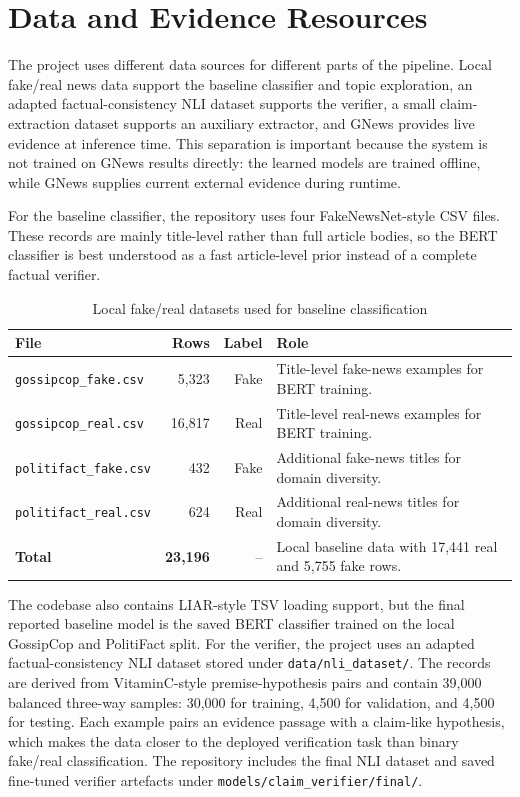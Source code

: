 \documentclass[11pt]{article}
\newcommand{\code}[1]{\texttt{#1}}
\begin{document}
\section{Data and Evidence Resources}

The project uses different data sources for different parts of the pipeline.
Local fake/real news data support the baseline classifier and topic exploration,
an adapted factual-consistency NLI dataset supports the verifier, a small
claim-extraction dataset supports an auxiliary extractor, and GNews provides
live evidence at inference time. This separation is important because the
system is not trained on GNews results directly: the learned models are trained
offline, while GNews supplies current external evidence during runtime.

For the baseline classifier, the repository uses four FakeNewsNet-style CSV
files. These records are mainly title-level rather than full article bodies, so
the BERT classifier is best understood as a fast article-level prior instead of
a complete factual verifier.

\begin{table}[H]
    \centering
    \caption{Local fake/real datasets used for baseline classification}
    \label{tab:baseline-data}
    \begin{tabularx}{\textwidth}{@{}lrrY@{}}
        \toprule
        \textbf{File} & \textbf{Rows} & \textbf{Label} & \textbf{Role} \\
        \midrule
        \code{gossipcop\_fake.csv} & 5,323 & Fake & Title-level fake-news examples for BERT training. \\
        \code{gossipcop\_real.csv} & 16,817 & Real & Title-level real-news examples for BERT training. \\
        \code{politifact\_fake.csv} & 432 & Fake & Additional fake-news titles for domain diversity. \\
        \code{politifact\_real.csv} & 624 & Real & Additional real-news titles for domain diversity. \\
        \midrule
        \textbf{Total} & \textbf{23,196} & -- & Local baseline data with 17,441 real and 5,755 fake rows. \\
        \bottomrule
    \end{tabularx}
\end{table}

The codebase also contains LIAR-style TSV loading support, but the final
reported baseline model is the saved BERT classifier trained on the local
GossipCop and PolitiFact split. For the verifier, the project uses an adapted
factual-consistency NLI dataset stored under \code{data/nli\_dataset/}. The
records are derived from VitaminC-style premise-hypothesis pairs and contain
39,000 balanced three-way
samples: 30,000 for training, 4,500 for validation, and 4,500 for testing. Each
example pairs an evidence passage with a claim-like hypothesis, which makes the
data closer to the deployed verification task than binary fake/real
classification. The repository includes the final NLI dataset and saved
fine-tuned verifier artefacts under \code{models/claim\_verifier/final/}.
\end{document}
